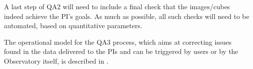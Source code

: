 


A last step of QA2 will need to include a final check that the images/cubes indeed achieve the PI's goals. As much as possible, all such checks will need to be automated, based on quantitative parameters. 





The operational model for the QA3 process, which aims at correcting issues found in the data delivered to the PIs and can be triggered by users or by the Observatory itself, is described in \cite{dp}.

